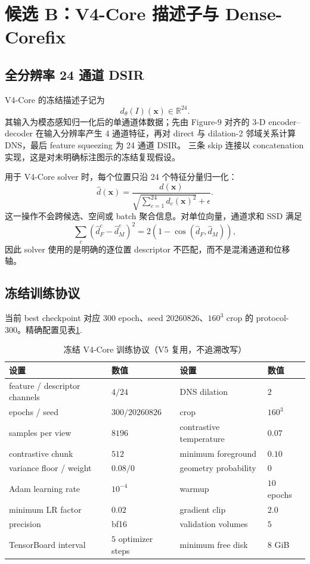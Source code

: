 \documentclass[11pt,a4paper]{ctexart}
\newcommand{\R}{\mathbb{R}}
\begin{document}
\section{候选 B：V4-Core 描述子与 Dense-Corefix}

\subsection{全分辨率 24 通道 DSIR}
V4-Core 的冻结描述子记为
\[
d_\theta(I)(\mathbf{x})\in\R^{24}.
\]
其输入为模态感知归一化后的单通道体数据；先由 Figure-9 对齐的 3-D
encoder--decoder 在输入分辨率产生 4 通道特征，再对 direct 与 dilation-2
邻域关系计算 DNS，最后 feature squeezing 为 24 通道 DSIR。
三条 skip 连接以 concatenation 实现，这是对未明确标注图示的冻结复现假设。

用于 V4-Core solver 时，每个位置只沿 24 个特征分量归一化：
\[
\hat d(\mathbf{x})
=\frac{d(\mathbf{x})}
{\sqrt{\sum_{c=1}^{24}d_c(\mathbf{x})^2}+\epsilon}.
\]
这一操作不会跨候选、空间或 batch 聚合信息。对单位向量，通道求和 SSD 满足
\[
\sum_c\left(\hat d_F^c-\hat d_M^c\right)^2
=2\left(1-\cos(\hat d_F,\hat d_M)\right),
\]
因此 solver 使用的是明确的逐位置 descriptor 不匹配，而不是混淆通道和位移轴。

\subsection{冻结训练协议}
当前 best checkpoint 对应 300 epoch、seed 20260826、$160^3$ crop 的
protocol-300。精确配置见表\ref{tab:training}.

\begin{table}[htbp]
\centering
\small
\caption{冻结 V4-Core 训练协议（V5 复用，不追溯改写）}
\label{tab:training}
\begin{tabular}{ll@{\qquad}ll}
\toprule
设置 & 数值 & 设置 & 数值\\
\midrule
feature / descriptor channels & $4/24$ &
DNS dilation & $2$\\
epochs / seed & $300/20260826$ &
crop & $160^3$\\
samples per view & $8196$ &
contrastive temperature & $0.07$\\
contrastive chunk & $512$ &
minimum foreground & $0.10$\\
variance floor / weight & $0.08/0$ &
geometry probability & $0$\\
Adam learning rate & $10^{-4}$ &
warmup & $10$ epochs\\
minimum LR factor & $0.02$ &
gradient clip & $2.0$\\
precision & bf16 &
validation volumes & $5$\\
TensorBoard interval & $5$ optimizer steps &
minimum free disk & $8$ GiB\\
\bottomrule
\end{tabular}
\end{table}
\end{document}
